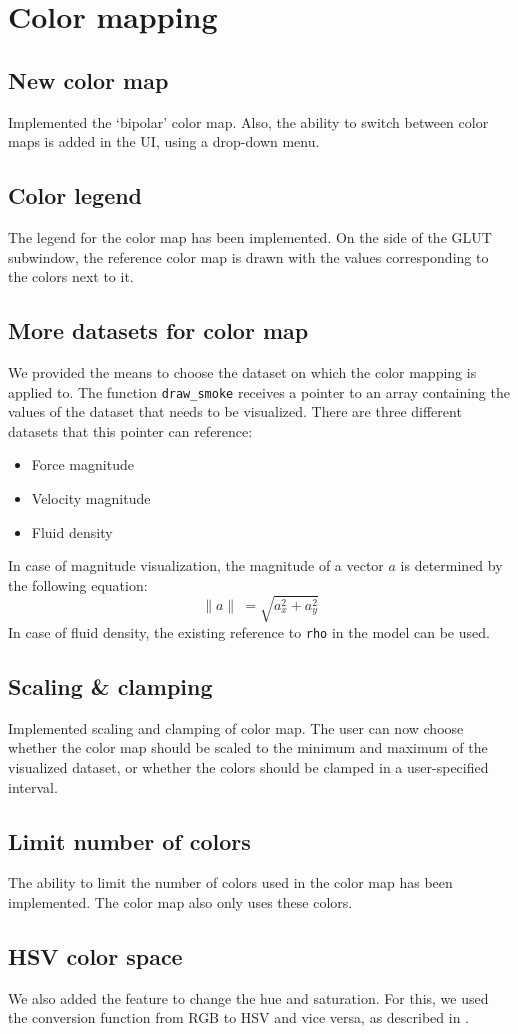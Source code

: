 \section{Color mapping}
	\subsection*{New color map}
		Implemented the `bipolar' color map.
		Also, the ability to switch between color maps is added in the UI, using a drop-down menu.
	\subsection*{Color legend}
		The legend for the color map has been implemented.
		On the side of the GLUT subwindow, the reference color map is drawn with the values corresponding to the colors next to it.
	\subsection*{More datasets for color map}
		We provided the means to choose the dataset on which the color mapping is applied to.
		The function \texttt{draw\_smoke} receives a pointer to an array containing the values of the dataset that needs to be visualized.
		There are three different datasets that this pointer can reference:
		\begin{itemize}
			\item Force magnitude
			\item Velocity magnitude
			\item Fluid density
		\end{itemize}
		In case of magnitude visualization, the magnitude of a vector \(a\) is determined by the following equation:
		\[\| a \|\ = \sqrt{a_x^2 + a_y^2}\]
		In case of fluid density, the existing reference to \texttt{rho} in the model can be used.
	\subsection*{Scaling \& clamping}
		Implemented scaling and clamping of color map.
		The user can now choose whether the color map should be scaled to the minimum and maximum of the visualized dataset, or whether the colors should be clamped in a user-specified interval.
	\subsection*{Limit number of colors}
		The ability to limit the number of colors used in the color map has been implemented.
		The color map also only uses these colors.
	\subsection*{HSV color space}
		We also added the feature to change the hue and saturation.
		For this, we used the conversion function from RGB to HSV and vice versa, as described in \cite{telea2014data}.